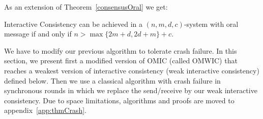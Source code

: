 

As an extension of Theorem~\ref{consensusOral} we get:
\begin{theorem}\label{crashIC}
  Interactive Consistency can be achieved in a $( n,m,d,c )$-system with oral
  message if and only if $n> \max \{ 2m+d,2d+m \} +c$.
\end{theorem}


\iffalse
The proofs of these theorem is by induction as before. The algorithm employed
is a slightly modified version of OMIC. The existence of crash-faulty
processes might send message $\perp$ since a particular round. In order to
handle these possible empty messages, every time when we select the majority value in step $3$ of OMIC,
the count for $\perp$ is subtracted by $c$ for a $( n,m,d,c )$-system. This new
slightly different algorithm is called OMIC'. The key point is: if a process
might crash but does not crash, it behaves the same as a correct process; if a
process crash at some point, it contributes nothing to the message passing
since the counter of $\perp$ is subtracted by $c$. Due to space limitations,
the proof is moved to appendix \ref{app:thmCrash}.
\fi

We have to modify our previous algorithm to tolerate crash failure.  
In this section, we present first  a modified version of OMIC (called OMWIC)
that reaches a weakest version of interactive consistency (weak interactive consistency)  
defined below. Then we use a classical algorithm \cite{lamport1982crash,dolev1982polynomial,dwork1990knowledge} with crash failure in synchronous rounds in which we replace the send/receive by our weak interactive consistency.
Due to space limitations, algorithms and proofs are moved to appendix~\ref{app:thmCrash}.

